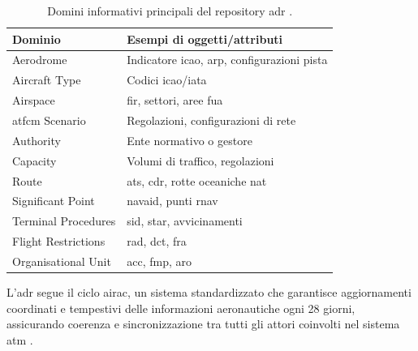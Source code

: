 \begin{table}[htbp]
  \centering
  \begin{tabular}{ll}
    \toprule
    \textbf{Dominio} & \textbf{Esempi di oggetti/attributi}\\
    \midrule
    Aerodrome & Indicatore \acrshort{icao}, \acrshort{arp}, configurazioni pista\\
    Aircraft Type & Codici \acrshort{icao}/\acrshort{iata}\\
    Airspace & \acrshort{fir}, settori, aree \acrshort{fua}\\
    \acrshort{atfcm} Scenario & Regolazioni, configurazioni di rete\\
    Authority & Ente normativo o gestore\\
    Capacity & Volumi di traffico, regolazioni\\
    Route & \acrshort{ats}, \acrshort{cdr}, rotte oceaniche \acrshort{nat}\\
    Significant Point & \acrshort{navaid}, punti \acrshort{rnav}\\
    Terminal Procedures & \acrshort{sid}, \acrshort{star}, avvicinamenti\\
    Flight Restrictions & \acrshort{rad}, \acrshort{dct}, \acrshort{fra}\\
    Organisational Unit & \acrshort{acc}, \acrshort{fmp}, \acrshort{aro}\\
    \bottomrule
  \end{tabular}
  \caption{Domini informativi principali del repository \gls{adr} \citep{eurocontrol2025adr}.}
  \label{tab:domini}
\end{table}

L'\gls{adr} segue il ciclo \gls{airac}, un sistema standardizzato che garantisce aggiornamenti coordinati e tempestivi delle informazioni aeronautiche ogni 28 giorni, assicurando coerenza e sincronizzazione tra tutti gli attori coinvolti nel sistema \gls{atm} \cite{eurocontrol2025adr}.


